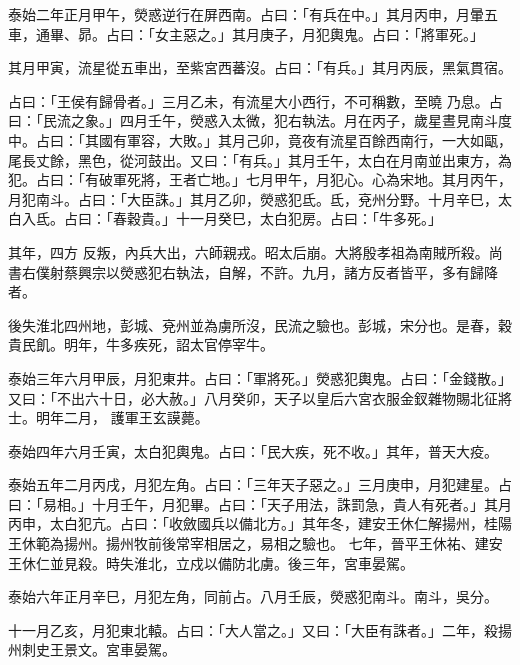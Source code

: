 \begin{pinyinscope}
 泰始二年正月甲午，熒惑逆行在屏西南。占曰：「有兵在中。」其月丙申，月暈五車，通畢、昴。占曰：「女主惡之。」其月庚子，月犯輿鬼。占曰：「將軍死。」



 其月甲寅，流星從五車出，至紫宮西蕃沒。占曰：「有兵。」其月丙辰，黑氣貫宿。



 占曰：「王侯有歸骨者。」三月乙未，有流星大小西行，不可稱數，至曉
 乃息。占曰：「民流之象。」四月壬午，熒惑入太微，犯右執法。月在丙子，歲星晝見南斗度中。占曰：「其國有軍容，大敗。」其月己卯，竟夜有流星百餘西南行，一大如甌，尾長丈餘，黑色，從河鼓出。又曰：「有兵。」其月壬午，太白在月南並出東方，為犯。占曰：「有破軍死將，王者亡地。」七月甲午，月犯心。心為宋地。其月丙午，月犯南斗。占曰：「大臣誅。」其月乙卯，熒惑犯氐。氐，兗州分野。十月辛巳，太白入氐。占曰：「春穀貴。」十一月癸巳，太白犯房。占曰：「牛多死。」



 其年，四方
 反叛，內兵大出，六師親戎。昭太后崩。大將殷孝祖為南賊所殺。尚書右僕射蔡興宗以熒惑犯右執法，自解，不許。九月，諸方反者皆平，多有歸降者。



 後失淮北四州地，彭城、兗州並為虜所沒，民流之驗也。彭城，宋分也。是春，穀貴民飢。明年，牛多疾死，詔太官停宰牛。



 泰始三年六月甲辰，月犯東井。占曰：「軍將死。」熒惑犯輿鬼。占曰：「金錢散。」又曰：「不出六十日，必大赦。」八月癸卯，天子以皇后六宮衣服金釵雜物賜北征將士。明年二月，
 護軍王玄謨薨。



 泰始四年六月壬寅，太白犯輿鬼。占曰：「民大疾，死不收。」其年，普天大疫。



 泰始五年二月丙戌，月犯左角。占曰：「三年天子惡之。」三月庚申，月犯建星。占曰：「易相。」十月壬午，月犯畢。占曰：「天子用法，誅罰急，貴人有死者。」其月丙申，太白犯亢。占曰：「收斂國兵以備北方。」其年冬，建安王休仁解揚州，桂陽王休範為揚州。揚州牧前後常宰相居之，易相之驗也。
 七年，晉平王休祐、建安王休仁並見殺。時失淮北，立戍以備防北虜。後三年，宮車晏駕。



 泰始六年正月辛巳，月犯左角，同前占。八月壬辰，熒惑犯南斗。南斗，吳分。



 十一月乙亥，月犯東北轅。占曰：「大人當之。」又曰：「大臣有誅者。」二年，殺揚州刺史王景文。宮車晏駕。




\end{pinyinscope}
